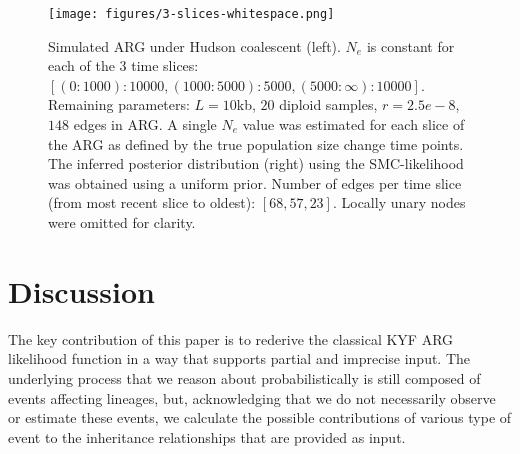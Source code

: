 \documentclass{article}
\begin{document}
\begin{figure}
    \centering
    \texttt{[image: figures/3-slices-whitespace.png]}
    \caption{Simulated ARG under Hudson coalescent (left). $N_e$ is constant
    for each of the 3 time slices: $[(0:1000): 10 000, (1000:5000): 5000,
    (5000:\infty):10 000]$. Remaining parameters: $L=10$kb, $20$ diploid samples,
    $r=2.5e-8$, $148$ edges in ARG. A single $N_e$ value was estimated for each
    slice of the ARG as defined by the true population size change time points.
    The inferred posterior distribution (right) using the SMC-likelihood was
    obtained using a uniform prior. Number of edges per time slice
    (from most recent slice to oldest): $[68, 57, 23]$. Locally unary nodes were
    omitted for clarity.}
    \label{fig:3-arg-slices}
\end{figure}


\section*{Discussion}

The key contribution of this paper is to rederive the classical KYF
ARG likelihood function in a way that supports partial and imprecise
input. 
The underlying process that we reason about probabilistically is still
composed of events affecting lineages, but, acknowledging that we 
do not necessarily observe or estimate these events, we calculate 
the possible contributions of various type of event to the inheritance
relationships that are provided as input.
\end{document}
